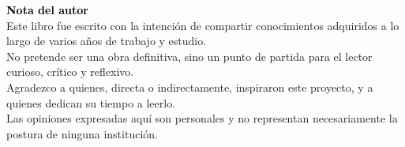 \vspace*{2cm}
\textcolor{black}{\Huge \textbf{Nota del autor}} \\[0.7cm] %

Este libro fue escrito con la intención de compartir conocimientos adquiridos a lo largo de varios años de trabajo y estudio.\\

No pretende ser una obra definitiva, sino un punto de partida para el lector curioso, crítico y reflexivo.\\

Agradezco a quienes, directa o indirectamente, inspiraron este proyecto, y a quienes dedican su tiempo a leerlo.\\

Las opiniones expresadas aquí son personales y no representan necesariamente la postura de ninguna institución.
\clearpage